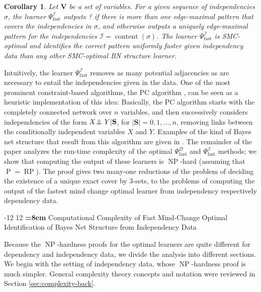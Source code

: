 \documentclass{elsarticle}%
\makeatletter
\renewcommand\section{\@startsection {section}{1}{\z@}%
  {-12\p@ \@plus -4\p@ \@minus -4\p@}%
                       {12\p@ \@plus 4\p@ \@minus 4\p@}%
                                   {\normalfont\large\bfseries\boldmath
                                   \rightskip=\z@ \@plus 8em\pretolerance=10000 }}
\newtheorem{corollary}[theorem]{Corollary}
\DeclareMathOperator{\content}{content}
\DeclareMathOperator{\Poly}{\mathbf{\mathrm{P}}}
\DeclareMathOperator{\RP}{\mathbf{\mathrm{RP}}}
\DeclareMathOperator{\NP}{\mathbf{\mathrm{NP}}}
\newcommand{\indep}{\ensuremath{\perp{}\!\!\!\!\!\!\!\perp{}}}
\renewcommand{\S}{\mathbf{{S}}}
\newcommand{\X}{X}
\newcommand{\Y}{Y}
\newcommand{\fast}{\mathrm{fast}}
\newcommand{\D}{\mathcal{D}}
\newcommand{\I}{\mathcal{I}}
\makeatother
\begin{document}
\begin{corollary}
Let $\mathbf{V}$ be a set of variables. For a given sequence of independencies
$\sigma$, the learner $\Psi_\fast^{\I}$ outputs ? if there is more
than one edge-maximal pattern that covers the independencies in $\sigma$, and
otherwise outputs 
a uniquely edge-maximal pattern for the
independencies $\I=\content(\sigma)$. The learner $\Psi_\fast^{\I}$ is SMC-optimal and identifies the
correct pattern uniformly faster given independency data than any other SMC-optimal BN structure learner.
\end{corollary}
%
Intuitively, the learner $\Psi_\fast^{\I}$ removes as many potential adjacencies as are necessary to entail the independencies given in the data. One of the most prominent constraint-based algorithms, the PC algorithm \cite[Ch.5.4.2]{peter00:_causat}, can be seen as a heuristic implementation of this idea: Basically, the PC algorithm starts with the completely connected network over $n$ variables, and then successively considers independencies of the form $\X\protect{\indep} \Y|\S$, for $|\S|=0,1,\ldots,n$, removing links between the conditionally independent variables $X$ and $Y$. Examples of the kind of Bayes net structure that result from this algorithm are given in \cite{peter00:_causat}.
The remainder of the paper analyzes the run-time complexity of the optimal $\Psi_\fast^{\D}$ and $\Psi_\fast^{\I}$ methods; we show that computing the output
of these learners is $\NP$-hard (assuming that $\Poly=\RP$). The proof gives two many-one reductions of the problem of deciding the existence of a unique
exact cover by 3-sets, to the problems of computing the output of the fastest mind
change optimal learner from independency respectively dependency data.

 
\section{Computational Complexity of Fast Mind-Change Optimal Identification of Bayes Net Structure from Independency Data}  \label{sec:complexity}

Because the $\NP$-hardness proofs for the optimal learners are quite different for dependency and independency data, we divide the analysis into different sections. We begin with the setting of independency data, whose $\NP$-hardness proof is much simpler. General complexity theory concepts and notation were reviewed in Section \ref{sec:complexity-back}.
\end{document}
